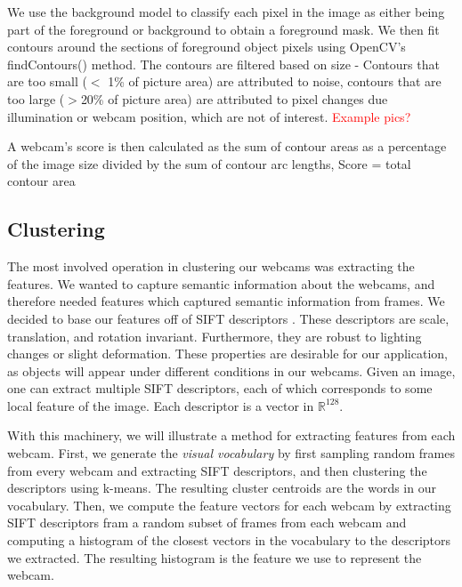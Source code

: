 \documentclass[10pt]{article} %
\begin{document}
We use the background model to classify each pixel in the image as either being part of the foreground or background to obtain a foreground mask. We then fit contours around the sections of foreground object pixels using OpenCV's findContours() method. The contours are filtered based on size - Contours that are too small ($<$ 1\% of picture area) are attributed to noise, contours that are too large ($>$20\% of picture area) are attributed to pixel changes due illumination or webcam position, which are not of interest. \textcolor{red}{Example pics?}

A webcam's score is then calculated as the sum of contour areas as a percentage of the image size divided by the sum of contour arc lengths, Score = total contour area %

\subsection{Clustering}
The most involved operation in clustering our webcams was extracting the
features. We wanted to capture semantic information about the webcams, and
therefore needed features which captured semantic information from frames. We
decided to base our features off of SIFT descriptors \cite{lowe}. These
descriptors are scale, translation, and rotation invariant. Furthermore, they
are robust to lighting changes or slight deformation. These properties are
desirable for our application, as objects will appear under different
conditions in our webcams. Given an image, one can extract multiple SIFT
descriptors, each of which corresponds to some local feature of the image. Each
descriptor is a vector in $\mathbb{R}^{128}$.

With this machinery, we will illustrate a method for extracting features from
each webcam. First, we generate the \textit{visual vocabulary} by first
sampling random frames from every webcam and extracting SIFT descriptors, and
then clustering the descriptors using k-means. The resulting cluster centroids
are the words in our vocabulary. Then, we compute the feature vectors for each
webcam by extracting SIFT descriptors fram a random subset of frames from each
webcam and computing a histogram of the closest vectors in the vocabulary to
the descriptors we extracted. The resulting histogram is the feature we use to
represent the webcam.
\end{document}
